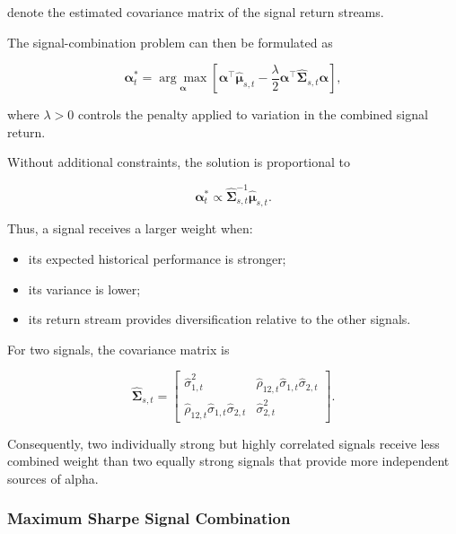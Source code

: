 \documentclass[11pt,a4paper]{article}
\begin{document}
denote the estimated covariance matrix of the signal return streams.

The signal-combination problem can then be formulated as

\begin{equation}
\boxed{
\boldsymbol{\alpha}_t^{*}
=
\underset{\boldsymbol{\alpha}}{\arg\max}
\left[
\boldsymbol{\alpha}^{\top}
\widehat{\boldsymbol{\mu}}_{s,t}
-
\frac{\lambda}{2}
\boldsymbol{\alpha}^{\top}
\widehat{\boldsymbol{\Sigma}}_{s,t}
\boldsymbol{\alpha}
\right],
}
\end{equation}

where $\lambda>0$ controls the penalty applied to variation in the combined
signal return.

Without additional constraints, the solution is proportional to

\begin{equation}
\boxed{
\boldsymbol{\alpha}_t^{*}
\propto
\widehat{\boldsymbol{\Sigma}}_{s,t}^{-1}
\widehat{\boldsymbol{\mu}}_{s,t}.
}
\end{equation}

Thus, a signal receives a larger weight when:

\begin{itemize}
    \item its expected historical performance is stronger;
    \item its variance is lower;
    \item its return stream provides diversification relative to the other
    signals.
\end{itemize}

For two signals, the covariance matrix is

\begin{equation}
\widehat{\boldsymbol{\Sigma}}_{s,t}
=
\begin{bmatrix}
\widehat{\sigma}_{1,t}^{2}
&
\widehat{\rho}_{12,t}
\widehat{\sigma}_{1,t}
\widehat{\sigma}_{2,t}
\\
\widehat{\rho}_{12,t}
\widehat{\sigma}_{1,t}
\widehat{\sigma}_{2,t}
&
\widehat{\sigma}_{2,t}^{2}
\end{bmatrix}.
\end{equation}

Consequently, two individually strong but highly correlated signals receive
less combined weight than two equally strong signals that provide more
independent sources of alpha.


\subsubsection{Maximum Sharpe Signal Combination}
\end{document}
